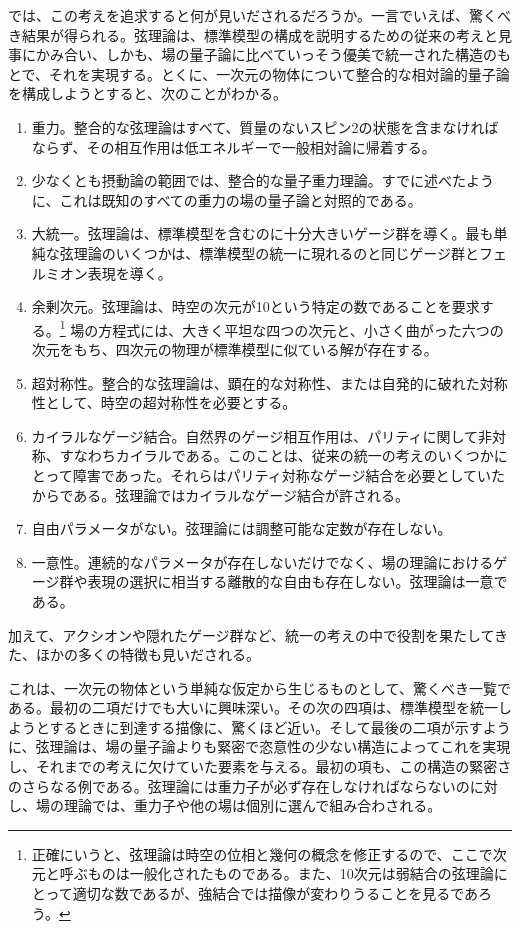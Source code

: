 では、この考えを追求すると何が見いだされるだろうか。一言でいえば、驚くべき結果が得られる。弦理論は、標準模型の構成を説明するための従来の考えと見事にかみ合い、しかも、場の量子論に比べていっそう優美で統一された構造のもとで、それを実現する。とくに、一次元の物体について整合的な相対論的量子論を構成しようとすると、次のことがわかる。
\begin{enumerate}
\item 重力。整合的な弦理論はすべて、質量のないスピン2の状態を含まなければならず、その相互作用は低エネルギーで一般相対論に帰着する。
\item 少なくとも摂動論の範囲では、整合的な量子重力理論。すでに述べたように、これは既知のすべての重力の場の量子論と対照的である。
\item 大統一。弦理論は、標準模型を含むのに十分大きいゲージ群を導く。最も単純な弦理論のいくつかは、標準模型の統一に現れるのと同じゲージ群とフェルミオン表現を導く。
\item 余剰次元。弦理論は、時空の次元が10という特定の数であることを要求する。\footnote[2]{正確にいうと、弦理論は時空の位相と幾何の概念を修正するので、ここで次元と呼ぶものは一般化されたものである。また、10次元は弱結合の弦理論にとって適切な数であるが、強結合では描像が変わりうることを見るであろう。}
場の方程式には、大きく平坦な四つの次元と、小さく曲がった六つの次元をもち、四次元の物理が標準模型に似ている解が存在する。
\item 超対称性。整合的な弦理論は、顕在的な対称性、または自発的に破れた対称性として、時空の超対称性を必要とする。
\item カイラルなゲージ結合。自然界のゲージ相互作用は、パリティに関して非対称、すなわちカイラルである。このことは、従来の統一の考えのいくつかにとって障害であった。それらはパリティ対称なゲージ結合を必要としていたからである。弦理論ではカイラルなゲージ結合が許される。
\item 自由パラメータがない。弦理論には調整可能な定数が存在しない。
\item 一意性。連続的なパラメータが存在しないだけでなく、場の理論におけるゲージ群や表現の選択に相当する離散的な自由も存在しない。弦理論は一意である。
\end{enumerate}
加えて、アクシオンや隠れたゲージ群など、統一の考えの中で役割を果たしてきた、ほかの多くの特徴も見いだされる。

これは、一次元の物体という単純な仮定から生じるものとして、驚くべき一覧である。最初の二項だけでも大いに興味深い。その次の四項は、標準模型を統一しようとするときに到達する描像に、驚くほど近い。そして最後の二項が示すように、弦理論は、場の量子論よりも緊密で恣意性の少ない構造によってこれを実現し、それまでの考えに欠けていた要素を与える。最初の項も、この構造の緊密さのさらなる例である。弦理論には重力子が必ず存在しなければならないのに対し、場の理論では、重力子や他の場は個別に選んで組み合わされる。

